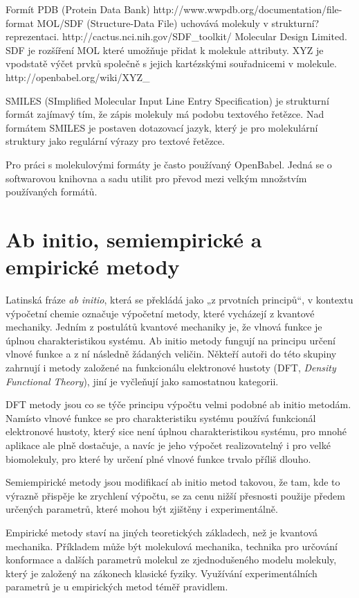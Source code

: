 \documentclass[
  color, %
  table, %
  lof,   %
  lot,   %
]{fithesis3}
\begin{document}
Formít PDB (Protein Data Bank) http://www.wwpdb.org/documentation/file-format MOL/SDF (Structure-Data File) uchovává molekuly v strukturní? reprezentaci. http://cactus.nci.nih.gov/SDF_toolkit/ Molecular Design Limited. SDF je rozšíření MOL které umožňuje přidat k molekule attributy. XYZ je vpodstatě výčet prvků společně s jejich kartézskými souřadnicemi v molekule. http://openbabel.org/wiki/XYZ_%

SMILES (SImplified Molecular Input Line Entry Specification) je strukturní formát zajímavý tím, že zápis molekuly má podobu textového řetězce. Nad formátem SMILES je postaven dotazovací jazyk, který je pro molekulární struktury jako regulární výrazy pro textové řetězce.

Pro práci s molekulovými formáty je často používaný OpenBabel. Jedná se o softwarovou knihovna a sadu utilit pro převod mezi velkým množstvím používaných formátů.

\section{Ab initio, semiempirické a empirické metody}

Latinská fráze \emph{ab initio}, která se překládá jako „z prvotních principů“, v kontextu výpočetní chemie označuje výpočetní metody, které vycházejí z kvantové mechaniky. Jedním z postulátů kvantové mechaniky je, že vlnová funkce je úplnou charakteristikou systému. Ab initio metody fungují na principu určení vlnové funkce a z ní následně žádaných veličin. Někteří autoři do této skupiny zahrnují i metody založené na funkcionálu elektronové hustoty (DFT,  \textit{\foreignlanguage{english}{Density Functional Theory}}), jiní je vyčleňují jako samostatnou kategorii.

DFT metody jsou co se týče principu výpočtu velmi podobné ab initio metodám. Namísto vlnové funkce se pro charakteristiku systému používá funkcionál elektronové hustoty, který sice není úplnou charakteristikou systému, pro mnohé aplikace ale plně dostačuje, a navíc je jeho výpočet realizovatelný i pro velké biomolekuly, pro které by určení plné vlnové funkce trvalo příliš dlouho.

Semiempirické metody jsou modifikací ab initio metod takovou, že tam, kde to výrazně přispěje ke zrychlení výpočtu, se za cenu nižší přesnosti použije předem určených parametrů, které mohou být zjištěny i experimentálně.

Empirické metody staví na jiných teoretických základech, než je kvantová mechanika. Příkladem může být molekulová mechanika, technika pro určování konformace a dalších parametrů molekul ze zjednodušeného modelu molekuly, který je založený na zákonech klasické fyziky. Využívání experimentálních parametrů je u empirických metod téměř pravidlem.
\end{document}
